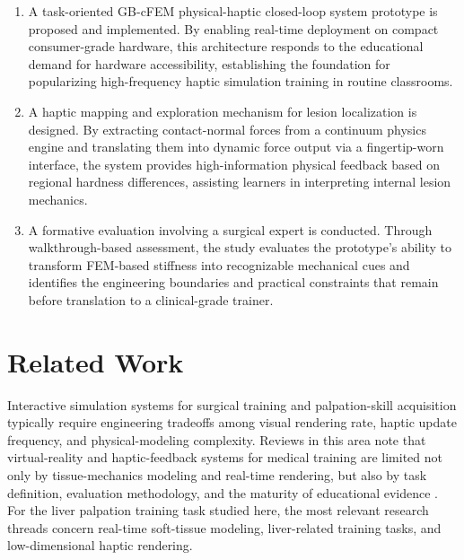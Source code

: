 \documentclass{ieeeaccess}
\begin{document}
\begin{enumerate}
\item A task-oriented GB-cFEM physical-haptic closed-loop system prototype is proposed and implemented. By enabling real-time deployment on compact consumer-grade hardware, this architecture responds to the educational demand for hardware accessibility, establishing the foundation for popularizing high-frequency haptic simulation training in routine classrooms.
\item A haptic mapping and exploration mechanism for lesion localization is designed. By extracting contact-normal forces from a continuum physics engine and translating them into dynamic force output via a fingertip-worn interface, the system provides high-information physical feedback based on regional hardness differences, assisting learners in interpreting internal lesion mechanics.
\item A formative evaluation involving a surgical expert is conducted. Through walkthrough-based assessment, the study evaluates the prototype's ability to transform FEM-based stiffness into recognizable mechanical cues and identifies the engineering boundaries and practical constraints that remain before translation to a clinical-grade trainer.
\end{enumerate}

\section{Related Work}
Interactive simulation systems for surgical training and palpation-skill acquisition typically require engineering tradeoffs among visual rendering rate, haptic update frequency, and physical-modeling complexity. Reviews in this area note that virtual-reality and haptic-feedback systems for medical training are limited not only by tissue-mechanics modeling and real-time rendering, but also by task definition, evaluation methodology, and the maturity of educational evidence \cite{overtoom2019haptic,rangarajan2020systematic,escobar2016review}. For the liver palpation training task studied here, the most relevant research threads concern real-time soft-tissue modeling, liver-related training tasks, and low-dimensional haptic rendering.
\end{document}
